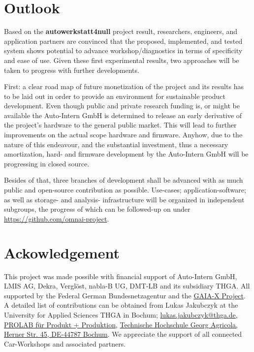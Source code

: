 \section{Outlook}
Based on the \textbf{autowerkstatt4null} project result, researchers, engineers, and application partners are convinced that the proposed, 
implemented, and tested system shows potential to advance workshop/diagnostics in terms of specificity and ease of use.
Given these first experimental results, two approaches will be taken to progress with further developments. 

First: a clear road map of future monetization of the project and its results has to be laid out in order to provide an environment for sustainable product development. 
Even though public and private research funding is, or might be available the Auto-Intern GmbH is determined to release an early derivative of the project's hardware to the general public market. 
This will lead to further improvements on the actual scope hardware and firmware. 
Anyhow, due to the nature of this endeavour, and the substantial investment, thus a necessary amortization, hard- and firmware development by the Auto-Intern GmbH will be progressing in closed source. 

Besides of that, three branches of development shall be advanced with as much public and open-source contribution as possible. 
Use-cases; application-software; as well as storage- and analysis- infrastructure will be organized in independent subgroups, 
the progress of which can be followed-up on under \url{https://github.com/omnai-project}.

\section{Ackowledgement}
This project was made possible with financial support of Auto-Intern GmbH, LMIS AG, Dekra, Verglöst, nabla-B UG, DMT-LB and its subsidiary THGA.
All supported by the Federal German Bundesnetzagentur and the \href{https://gaia-x.eu/}{GAIA-X Project}.
A detailed list of contributions can be obtained from Lukas Jakubczyk at the University for Applied Sciences THGA in Bochum; \href{mailto:lukas.jakubczyk@thga.de}{lukas.jakubczyk@thga.de}, \href{https://www.thga.de/forschung/maschinenbau-und-materialwissenschaften/labore/prolab-produkt-produktion}{PROLAB für Produkt + Produktion}, \href{https://maps.app.goo.gl/tQA3Qfn5f6gGqMHg8}{Technische Hochschule Georg Agricola, Herner Str. 45, DE-44787 Bochum}.
We appreciate the support of all connected Car-Workshops and associated partners. 




